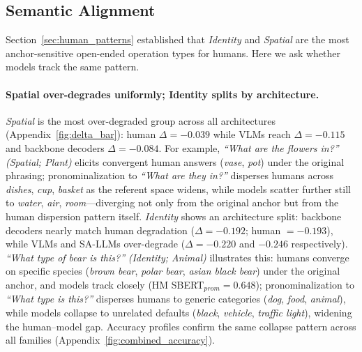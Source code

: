 \documentclass[letterpaper]{article}
\begin{document}
\subsection{Semantic Alignment}
\label{sec:alignment_main}
Section~\ref{sec:human_patterns} established that \textit{Identity} and \textit{Spatial} are the most anchor-sensitive open-ended operation types for humans. Here we ask whether models track the same pattern.

\paragraph{Spatial over-degrades uniformly; Identity splits by architecture.}
\textit{Spatial} is the most over-degraded group across all architectures (Appendix~\ref{fig:delta_bar}): human $\Delta{=}{-}0.039$ while VLMs reach $\Delta{=}{-}0.115$ and backbone decoders $\Delta{=}{-}0.084$.
For example, \textit{``What are the flowers in?''} \emph{(Spatial; Plant)} elicits convergent human answers (\textit{vase}, \textit{pot}) under the original phrasing; pronominalization to \textit{``What are they in?''} disperses humans across \textit{dishes}, \textit{cup}, \textit{basket} as the referent space widens, while models scatter further still to \textit{water}, \textit{air}, \textit{room}---diverging not only from the original anchor but from the human dispersion pattern itself.
\textit{Identity} shows an architecture split: backbone decoders nearly match human degradation ($\Delta{=}{-}0.192$; human ${=}{-}0.193$), while VLMs and SA-LLMs over-degrade ($\Delta{=}{-}0.220$ and ${-}0.246$ respectively).
\textit{``What type of bear is this?''} \emph{(Identity; Animal)} illustrates this: humans converge on specific species (\textit{brown bear}, \textit{polar bear}, \textit{asian black bear}) under the original anchor, and models track closely (HM SBERT$_{prom}{=}0.648$); pronominalization to \textit{``What type is this?''} disperses humans to generic categories (\textit{dog}, \textit{food}, \textit{animal}), while models collapse to unrelated defaults (\textit{black}, \textit{vehicle}, \textit{traffic light}), widening the human--model gap.
Accuracy profiles confirm the same collapse pattern across all families (Appendix~\ref{fig:combined_accuracy}).
\end{document}
